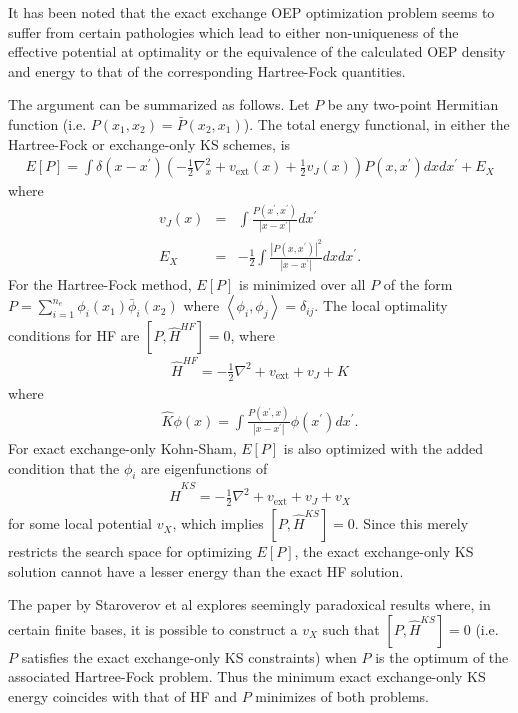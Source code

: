 \documentclass{article}
\newcommand{\beas}{\begin{eqnarray*}}
\newcommand{\enas}{\end{eqnarray*}}
\newcommand{\half}{{\frac{1}{2}}} \newcommand{\quarter}{{\frac{1}{4}}}
\newcommand{\paren}[1]{\left({#1}\right)}
\newcommand{\brparen}[1]{\left[{#1}\right]}
\newcommand{\inp}[1]{\left<{#1}\right>}
\begin{document}
It has been noted that the exact exchange OEP optimization
problem seems to suffer from certain pathologies which
lead to either non-uniqueness of the effective potential
at optimality or the equivalence of the calculated OEP density
and energy to that of the corresponding Hartree-Fock quantities.

The argument can be summarized as follows.
Let $P$ be any two-point Hermitian function
(i.e. $P(x_1,x_2) = \bar{P}(x_2,x_1)$).
The total energy functional, in either the Hartree-Fock or exchange-only
KS schemes, is
\beas
E[P] = \int \delta(x-x^\prime) \paren{
-\half \nabla_{x}^2 + v_{\mbox{ext}}(x) + \half v_J(x)
}
P(x,x^\prime)
dx dx^\prime 
 + E_X
\enas
where
\beas
v_J(x) &=& \int \frac{P(x^\prime,x^\prime)}{|x-x^\prime|} dx^\prime\\
E_X &=& - \half \int \frac{|P(x,x^\prime)|^2}{|x-x^\prime|}
 dx dx^\prime.
\enas
For the Hartree-Fock method, $E[P]$ is minimized over all
$P$ of the form $P = \sum_{i=1}^{n_e} \phi_i(x_1) \bar{\phi}_i(x_2)$
where $\inp{\phi_i, \phi_j } = \delta_{ij}$.
The local optimality conditions for HF are
$\brparen{P, \hat{H}^{HF}} = 0$, where
\beas
\hat{H}^{HF} = -\half \nabla^2 + v_{\mbox{ext}} + v_J + \hat{K}
\enas
where
\beas
\hat{K} \phi(x) = \int \frac{P(x^\prime,x)}{|x-x^\prime|} \phi(x^\prime) dx^\prime .
\enas
For exact exchange-only Kohn-Sham, $E[P]$ is also optimized with the added
condition that the $\phi_i$ are eigenfunctions of
\beas
\hat{H}^{KS} = -\half \nabla^2 + v_{\mbox{ext}} + v_J + v_X
\enas
for some local potential $v_X$, which implies
$\brparen{P, \hat{H}^{KS}} = 0$.  Since this merely restricts
the search space for optimizing $E[P]$, the exact exchange-only
KS solution cannot have a lesser energy than the exact HF solution.

The paper by
Staroverov et al explores seemingly paradoxical results
where, in certain finite bases, it is possible to construct a
$v_X$ such that $\brparen{P, \hat{H}^{KS}} = 0$ (i.e.
$P$ satisfies the exact exchange-only KS constraints)
when $P$ is the optimum of the associated Hartree-Fock
problem.  Thus
the minimum exact exchange-only KS energy coincides
with that of HF and $P$ minimizes of both problems.
\end{document}
